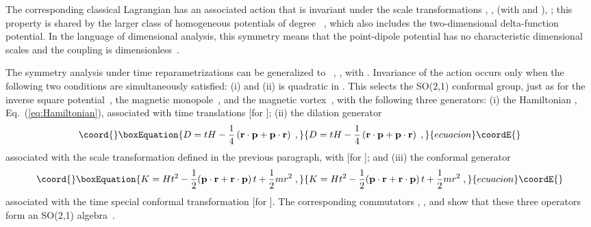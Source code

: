 \documentclass[a4paper,twocolumn,
showpacs,amssymb,aps,prl,superscriptaddress]{revtex4}%
\begin{document}
The corresponding classical Lagrangian \coordHE{} has an associated action that is
  invariant under the scale
transformations \coordHE{}, \coordHE{}, (with \coordHE{} and \coordHE{}), \coordHE{}; this property is shared by the larger class of homogeneous
potentials of degree \coordHE{}~\cite{cam:00b}, which also includes the
two-dimensional delta-function potential. In the language of
dimensional analysis, this symmetry means that the point-dipole
potential has no characteristic dimensional scales and the
coupling \myHighlight{$\lambda$}\coordHE{} is dimensionless~\cite{self-adjointness}.

The symmetry analysis under time reparametrizations can be
generalized to~\cite{jac:80,jac:90} \coordHE{}, \coordHE{}, with \coordHE{}. Invariance
of the action occurs only when the following two conditions are
simultaneously satisfied: (i) \coordHE{} and (ii) \coordHE{} is
quadratic in \coordHE{}. This selects the SO(2,1) conformal group, just
as for the inverse square potential~\cite{alf:76}, the magnetic
monopole~\cite{jac:80}, and the magnetic vortex~\cite{jac:90},
with the following three generators: (i) the Hamiltonian \coordHE{},
Eq.~(\ref{eq:Hamiltonian}), associated with time translations \coordHE{}
 [for \coordHE{}];
(ii) the dilation generator
\begin{equation}\coord{}\boxEquation{
D= t H - \frac{1}{4} \left( {\bf r} \cdot {\bf p} + {\bf p} \cdot
{\bf r}
 \right)
 \;  ,
}{
D= t H - \frac{1}{4} \left( {\bf r} \cdot {\bf p} + {\bf p} \cdot
{\bf r}
 \right)
 \;  ,
}{ecuacion}\coordE{}\end{equation}
associated with the scale transformation defined in the previous
paragraph, with \coordHE{} [for \coordHE{}]; and (iii) the
conformal generator
\begin{equation}\coord{}\boxEquation{
K= H t^{2} - \frac{1}{2} ({\bf p} \cdot {\bf r} + {\bf r} \cdot
{\bf p} ) \,
 t + \frac{1}{2} m
r^{2}
 \;  ,
}{
K= H t^{2} - \frac{1}{2} ({\bf p} \cdot {\bf r} + {\bf r} \cdot
{\bf p} ) \,
 t + \frac{1}{2} m
r^{2}
 \;  ,
}{ecuacion}\coordE{}\end{equation}
associated with the time special conformal transformation \coordHE{} [for \coordHE{}].
 The corresponding
commutators \coordHE{}, \coordHE{}, and \coordHE{} show that these three operators form an SO(2,1)
algebra~\cite{wyb:74}.
\end{document}
